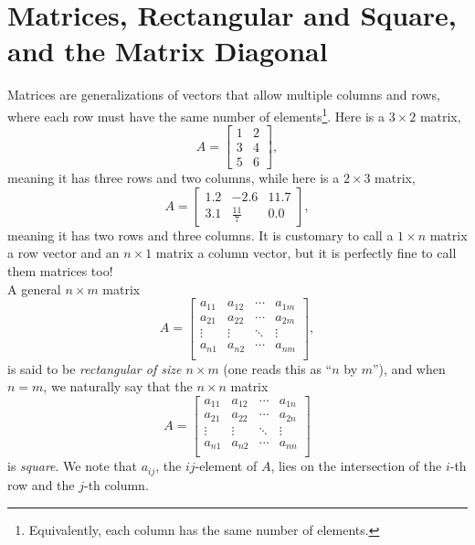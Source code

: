 \section{Matrices, Rectangular and Square, and the Matrix Diagonal}

Matrices are generalizations of vectors that allow multiple columns and rows, where each row must have the same number of elements\footnote{Equivalently, each column has the same number of elements.}. Here is a $3\times 2$ matrix, 
\begin{equation}
 A=\left[\begin{array}{cc} 1 & 2\\
3 & 4 \\ 5 & 6 \end{array}\right],   
\end{equation}
meaning it has three rows and two columns, while here is a $2 \times 3$ matrix,
\begin{equation}
 A=\left[\begin{array}{rrr} 1.2 & -2.6 & 11.7\\
3.1 & \frac{11}{7} & 0.0\end{array}\right],   
\end{equation}
meaning it has two rows and three columns. It is customary to call a $1 \times n$ matrix a row vector and an $n \times 1$ matrix a column vector, but it is perfectly fine to call them matrices too! \\

A general $n \times m$ matrix 
\begin{equation}
\label{eq:rectangularMatrix}
 A=\left[\begin{array}{cccc} a_{11} & a_{12} & \cdots & a_{1m}\\
a_{21} & a_{22} & \cdots & a_{2m} \\ \vdots & \vdots & \ddots& \vdots \\
a_{n1} & a_{n2} & \cdots & a_{nm}\\\end{array}\right],   
\end{equation}
is said to be \textit{rectangular of size $n \times m$} (one reads this as ``$n$ by $m$''), and when $n=m$, we naturally say that the $n \times n$ matrix
\begin{equation}
\label{eq:squareMatrix}
 A=\left[\begin{array}{cccc} a_{11} & a_{12} & \cdots & a_{1n}\\
a_{21} & a_{22} & \cdots & a_{2n} \\ \vdots & \vdots & \ddots& \vdots \\
a_{n1} & a_{n2} & \cdots & a_{nn}\\\end{array}\right] 
\end{equation}
is \textit{square}.
We note that $a_{ij}$, the $ij$-element of $A$, lies on the intersection of the $i$-th row and the $j$-th column. \\

